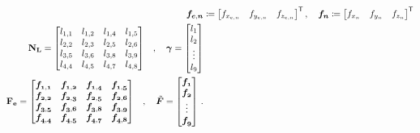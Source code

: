 \begin{subequations}
  \begin{align}
    \vec{f_{e,n}} & \coloneqq	\begin{bmatrix}
      f_{x_{e,n}} & f_{y_{e,n}} & f_{z_{e,n}}
    \end{bmatrix}^{\mathsf{T}}, \quad
    \vec{f_{n}} \coloneqq	\begin{bmatrix}
      f_{x_{n}} & f_{y_{n}} & f_{z_{n}}
    \end{bmatrix}^{\mathsf{T}}            \\
    \begin{split}
      \mtx{N_{L}} &=	\begin{bmatrix}
        l_{1,1} & l_{1,2} & l_{1,4} & l_{1,5} \\
        l_{2,2} & l_{2,3} & l_{2,5} & l_{2,6} \\
        l_{3,5} & l_{3,6} & l_{3,8} & l_{3,9} \\
        l_{4,4} & l_{4,5} & l_{4,7} & l_{4,8} \\
      \end{bmatrix}
    \end{split}
    , \quad
    \vec{\gamma} =   \begin{bmatrix}
      l_1    \\
      l_2    \\
      \vdots \\
      l_9
    \end{bmatrix}                             \\
    \begin{split}
      \mtx{F_{e}} &=	\begin{bmatrix}
        \vec{f_{1,1}} & \vec{f_{1,2}} & \vec{f_{1,4}} & \vec{f_{1,5}} \\
        \vec{f_{2,2}} & \vec{f_{2,3}} & \vec{f_{2,5}} & \vec{f_{2,6}} \\
        \vec{f_{3,5}} & \vec{f_{3,6}} & \vec{f_{3,8}} & \vec{f_{3,9}} \\
        \vec{f_{4,4}} & \vec{f_{4,5}} & \vec{f_{4,7}} & \vec{f_{4,8}} \\
      \end{bmatrix}
    \end{split}
    ,\quad
    \vec{\tilde{F}} = 	\begin{bmatrix}
      \vec{f_{1}} \\
      \vec{f_{2}} \\
      \vdots      \\
      \vec{f_{9}}
    \end{bmatrix}\,.\label{eq:force_imp}
  \end{align}
\end{subequations}
